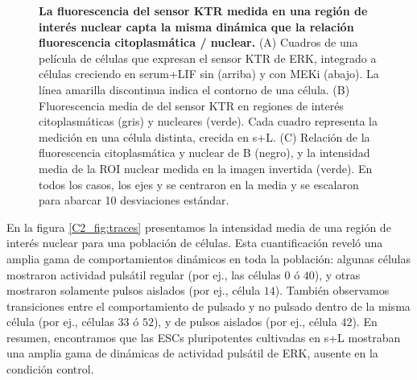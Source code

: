 \documentclass[./main.tex]{subfiles}
\begin{document}
\begin{figure}
    \caption{\textbf{La fluorescencia del sensor KTR medida en una región de interés nuclear capta la misma dinámica que la relación fluorescencia citoplasmática / nuclear.} (A) Cuadros de una película de células que expresan el sensor KTR de ERK, integrado a células creciendo en serum+LIF sin (arriba) y con MEKi (abajo). La línea amarilla discontinua indica el contorno de una célula. (B) Fluorescencia media de del sensor KTR en regiones de interés citoplasmáticas (gris) y nucleares (verde). Cada cuadro representa la medición en una célula distinta, crecida en s+L. (C) Relación de la fluorescencia citoplasmática y nuclear de B (negro), y la intensidad media de la ROI nuclear medida en la imagen invertida (verde). En todos los casos, los ejes y se centraron en la media y se escalaron para abarcar 10 desviaciones estándar.}
    \label{C2_fig:citoplasma_nucleo}
\end{figure}


En la figura \ref{C2_fig:traces} presentamos la intensidad media de una región de interés nuclear para una población de células. Esta cuantificación reveló una amplia gama de comportamientos dinámicos en toda la población: algunas células mostraron actividad pulsátil regular (por ej., las células $0$ ó $40$), y otras mostraron solamente pulsos aislados (por ej., célula $14$). También observamos transiciones entre el comportamiento de pulsado y no pulsado dentro de la misma célula (por ej., células $33$ ó $52$), y de pulsos aislados (por ej., célula $42$). En resumen, encontramos que las ESCs pluripotentes cultivadas en s+L mostraban una amplia gama de dinámicas de actividad pulsátil de ERK, ausente en la condición control.


\end{document}

